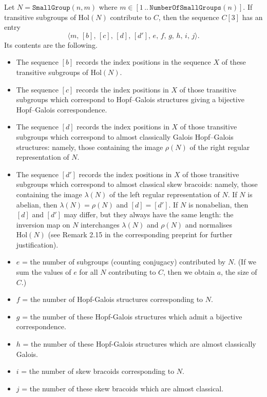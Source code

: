\documentclass[a4paper,11pt]{article}
\begin{document}
	Let $N = \mathtt{SmallGroup}(n, m)$ where 
	$m \in [1\,..\,\mathtt{NumberOfSmallGroups}(n)]$.
	If transitive subgroups of $\mathrm{Hol}(N)$ contribute to $C$, 
	then the sequence $C[3]$ has an entry 
	$$\langle m,\,[b],\,[c],\,[d],\,[d'],\, e,\,f,\,g,\,h,\,i,\,j\rangle.$$
	Its contents are the following.
	\begin{itemize}
		\item The sequence $[b]$ records the index positions in the sequence $X$ of these
		transitive subgroups of $\mathrm{Hol}(N)$.
		
		\item The sequence $[c]$ records the index positions in $X$ of those transitive subgroups which
		correspond to Hopf--Galois structures giving a bijective Hopf--Galois
		correspondence.
		
		\item The sequence $[d]$ records the index positions in $X$ of 
those transitive 
		subgroups which correspond to  almost classically Galois 
		Hopf--Galois structures: namely, those containing the image 
		$\rho(N)$ of the right regular representation of $N$.

		\item The sequence $[d']$ records the index positions in $X$ of 
		those transitive subgroups which correspond to almost classical 
		skew bracoids: namely, those containing the image $\lambda(N)$ of 
		the left regular representation of $N$.
		If $N$ is abelian, then $\lambda(N)=\rho(N)$ and $[d]=[d']$. 
		If $N$ is nonabelian, then $[d]$ and $[d']$ may differ, but they 
		always have the same length: the inversion map on $N$ 
		interchanges $\lambda(N)$ and $\rho(N)$ and normalises 
		$\mathrm{Hol}(N)$ (see Remark 2.15 in the corresponding preprint for further justification). 
		
		\item $e$ = the number of subgroups (counting conjugacy) contributed 
		by $N$. (If we sum the values of $e$ for all $N$ contributing 
		to $C$, then we obtain $a$, the size of $C$.)
		
		\item $f$ = the number of Hopf-Galois structures corresponding to $N$.
		\item $g$ = the number of these Hopf-Galois structures which 
		admit a bijective correspondence.
		\item $h$ = the number of these Hopf-Galois structures  which are almost classically Galois.
		\item $i$ = the number of skew bracoids corresponding to $N$.
		\item $j$ = the number of these skew bracoids which are almost classical.
	\end{itemize}
	
\end{document}
